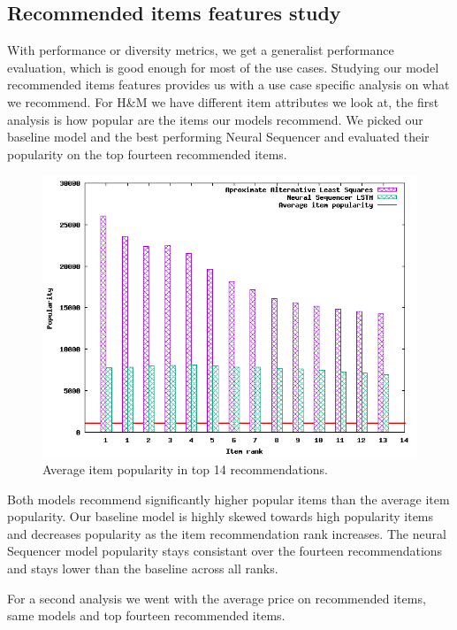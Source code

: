 \documentclass{kththesis}
\begin{document}
\subsection{Recommended items features study}
With performance or diversity metrics, we get a generalist performance evaluation, which is good enough for most of the use cases. Studying our model recommended items features provides us with a use case specific analysis on what we recommend. For H\&M we have different item attributes we look at, the first analysis is how popular are the items our models recommend. We picked our baseline model and the best performing Neural Sequencer and evaluated their popularity on the top fourteen recommended items.


\begin{figure}[H]
    \centering
    \includegraphics[scale=0.75]{charts/popularity.png}
    \caption{Average item popularity in top 14 recommendations.}
\end{figure}

Both models recommend significantly higher popular items than the average item popularity. Our baseline model is highly skewed towards high popularity items and decreases popularity as the item recommendation rank increases. The neural Sequencer model popularity stays consistant over the fourteen recommendations and stays lower than the baseline across all ranks.

For a second analysis we went with the average price on recommended items, same models and top fourteen recommended items.
\end{document}
